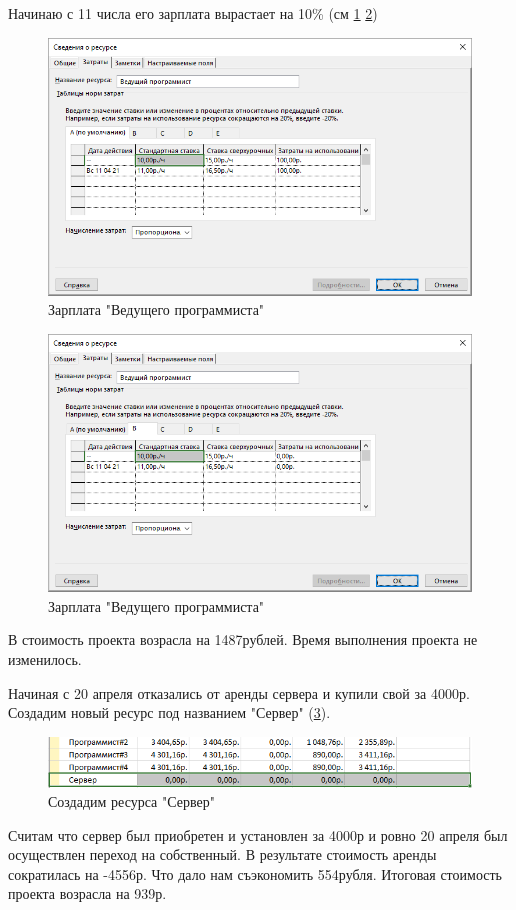 Начинаю с 11 числа его зарплата вырастает на 10\% (см \ref{fig:46} \ref{fig:47})
\begin{figure}[H]
	\centering
	\includegraphics[width=0.7\linewidth]{src/4_6}
	\caption{Зарплата "Ведущего программиста"}
	\label{fig:46}
\end{figure}
\begin{figure}[H]
	\centering
	\includegraphics[width=0.7\linewidth]{src/4_7}
	\caption{Зарплата "Ведущего программиста"}
	\label{fig:47}
\end{figure}

В стоимость проекта возрасла на 1487рублей.
Время выполнения проекта не изменилось.

Начиная с 20 апреля отказались от аренды сервера и купили свой за 4000р.
Создадим новый ресурс под названием "Сервер" (\ref{fig:48}).
\begin{figure}[H]
	\centering
	\includegraphics[width=0.7\linewidth]{src/4_8}
	\caption{Создадим ресурса "Сервер"}
	\label{fig:48}
\end{figure}

Считам что сервер был приобретен и установлен за 4000р и ровно 20 апреля был осуществлен переход на собственный.
В результате стоимость аренды сократилась на -4556р. Что дало нам съэкономить 554рубля.
Итоговая стоимость проекта возрасла на 939р.

